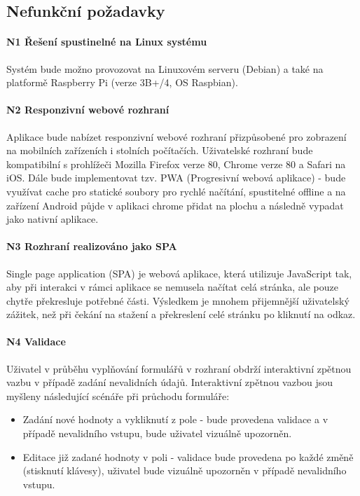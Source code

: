 \subsection{Nefunkční požadavky}

\paragraph{N1 Řešení spustinelné na Linux systému}
Systém bude možno provozovat na Linuxovém serveru (Debian) a také na platformě Raspberry Pi (verze 3B+/4, OS Raspbian).

\paragraph{N2 Responzivní webové rozhraní}
Aplikace bude nabízet responzivní webové rozhraní přizpůsobené pro zobrazení na mobilních zařízeních i stolních počítačích. Uživatelské rozhraní bude kompatibilní s prohlížeči Mozilla Firefox verze 80, Chrome verze 80 a Safari na iOS. Dále bude implementovat tzv. PWA (Progresivní webová aplikace) - bude využívat cache pro statické soubory pro rychlé načítání, spustitelné offline a na zařízení Android půjde v aplikaci chrome přidat na plochu a následně vypadat jako nativní aplikace.

\paragraph{N3 Rozhraní realizováno jako SPA}
Single page application (SPA) je webová aplikace, která utilizuje JavaScript tak, aby při interakci v rámci aplikace se nemusela načítat celá stránka, ale pouze chytře překresluje potřebné části. Výsledkem je mnohem přijemnější uživatelský zážitek, než při čekání na stažení a překreslení celé stránku po kliknutí na odkaz.

\paragraph{N4 Validace}
Uživatel v průběhu vyplňování formulářů v rozhraní obdrží interaktivní zpětnou vazbu v případě zadání nevalidních údajů. Interaktivní zpětnou vazbou jsou myšleny následující scénáře při průchodu formuláře:
\begin{itemize}
    \item Zadání nové hodnoty a vykliknutí z pole - bude provedena validace a v případě nevalidního vstupu, bude uživatel vizuálně  upozorněn.
    \item Editace již zadané hodnoty v poli - validace bude provedena po každé změně (stisknutí klávesy), uživatel bude vizuálně upozorněn v případě nevalidního vstupu.
\end{itemize}

